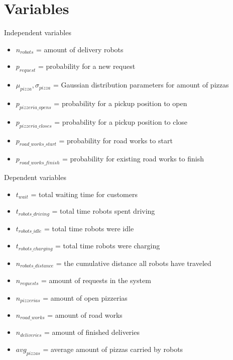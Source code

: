 \section{Variables}
\begin{frame}{Independent variables}
    \begin{itemize}
        \item $n_{robots}$ = amount of delivery robots
        \item $p_{request}$ = probability for a new request
        \item $\mu_{pizza}, \sigma_{pizza}$ = Gaussian distribution parameters for amount of pizzas
        \item $p_{pizzeria\_opens}$  = probability for a pickup position to open
        \item $p_{pizzeria\_closes}$ = probability for a pickup position to close
        \item $p_{road\_works\_start}$ = probability for road works to start
        \item $p_{road\_works\_finish}$ = probability for existing road works to finish
    \end{itemize}
\end{frame}

\begin{frame}{Dependent variables}
    \begin{itemize}
        \item $t_{wait}$ = total waiting time for customers                             %
        \item $t_{robots\_driving}$ = total time robots spent driving                   %
        \item $t_{robots\_idle}$ = total time robots were idle                          %
        \item $t_{robots\_charging}$ = total time robots were charging                  %
        \item $n_{robots\_distance}$ = the cumulative distance all robots have traveled %
        \item $n_{requests}$ = amount of requests in the system                         %
        \item $n_{pizzerias}$ = amount of open pizzerias                                %
        \item $n_{road\_works}$ = amount of road works                                  %
        \item $n_{deliveries}$ = amount of finished deliveries                          %
        \item $avg_{pizzas}$ = average amount of pizzas carried by robots               %
    \end{itemize}
\end{frame}

